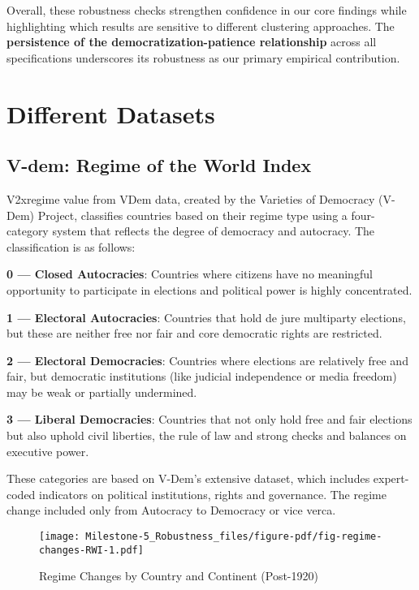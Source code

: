 \documentclass[
  letterpaper,
  DIV=11,
  numbers=noendperiod]{scrartcl}
\begin{document}
Overall, these robustness checks strengthen confidence in our core
findings while highlighting which results are sensitive to different
clustering approaches. The \textbf{persistence of the
democratization-patience relationship} across all specifications
underscores its robustness as our primary empirical contribution.

\hypertarget{different-datasets}{%
\section{Different Datasets}\label{different-datasets}}

\hypertarget{v-dem-regime-of-the-world-index}{%
\subsection{V-dem: Regime of the World
Index}\label{v-dem-regime-of-the-world-index}}

V2xregime value from VDem data, created by the Varieties of Democracy
(V-Dem) Project, classifies countries based on their regime type using a
four-category system that reflects the degree of democracy and
autocracy. The classification is as follows:

\textbf{0 --- Closed Autocracies}: Countries where citizens have no
meaningful opportunity to participate in elections and political power
is highly concentrated.

\textbf{1 --- Electoral Autocracies}: Countries that hold de jure
multiparty elections, but these are neither free nor fair and core
democratic rights are restricted.

\textbf{2 --- Electoral Democracies}: Countries where elections are
relatively free and fair, but democratic institutions (like judicial
independence or media freedom) may be weak or partially undermined.

\textbf{3 --- Liberal Democracies}: Countries that not only hold free
and fair elections but also uphold civil liberties, the rule of law and
strong checks and balances on executive power.

These categories are based on V-Dem's extensive dataset, which includes
expert-coded indicators on political institutions, rights and
governance. The regime change included only from Autocracy to Democracy
or vice verca.

\begin{figure}[H]

{\centering \texttt{[image: Milestone-5\_Robustness\_files/figure-pdf/fig-regime-changes-RWI-1.pdf]}

}

\caption{\label{fig-regime-changes-RWI}Regime Changes by Country and
Continent (Post-1920)}

\end{figure}
\end{document}
